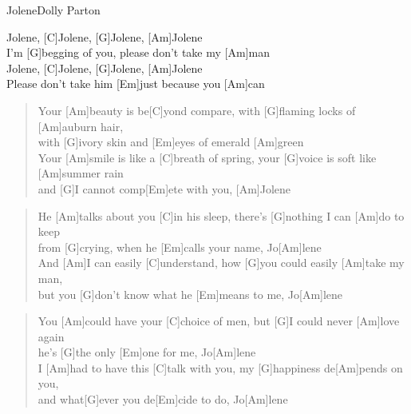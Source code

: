 \begin{song}{Jolene}{Dolly Parton}

    \begin{chorus}
	    [Am]Jolene, [C]Jolene, [G]Jolene, [Am]Jolene \\
        I'm [G]begging of you, please don't take my [Am]man \\
        [Am]Jolene, [C]Jolene, [G]Jolene, [Am]Jolene \\
        [G]Please don't take him [Em]just because you [Am]can
    \end{chorus}

    \begin{verse}  
        Your [Am]beauty is be[C]yond compare, with [G]flaming locks of [Am]auburn hair, \\
        with [G]ivory skin and [Em]eyes of emerald [Am]green \\
        Your [Am]smile is like a [C]breath of spring, your [G]voice is soft like [Am]summer rain \\
        and [G]I cannot comp[Em]ete with you, [Am]Jolene 
    \end{verse}  


    \begin{verse}  
        He [Am]talks about you [C]in his sleep, there's [G]nothing I can [Am]do to keep \\
        from [G]crying, when he [Em]calls your name, Jo[Am]lene \\
        And [Am]I can easily [C]understand, how [G]you could easily [Am]take my man, \\
        but you [G]don't know what he [Em]means to me, Jo[Am]lene
    \end{verse}  


    \begin{verse}  
        You [Am]could have your [C]choice of men, but [G]I could never [Am]love again \\
        he's [G]the only [Em]one for me, Jo[Am]lene \\
        I [Am]had to have this [C]talk with you, my [G]happiness de[Am]pends on you, \\
        and what[G]ever you de[Em]cide to do, Jo[Am]lene
    \end{verse}  


\end{song}
